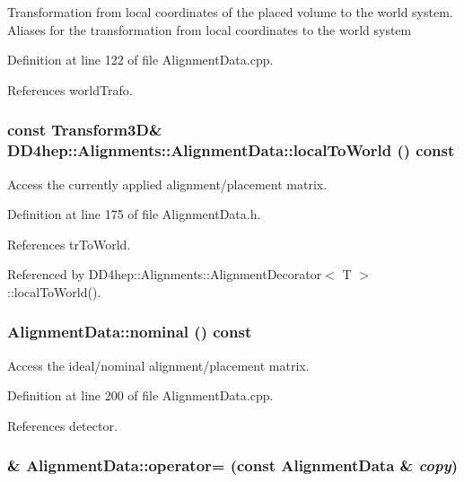 Transformation from local coordinates of the placed volume to the world system. Aliases for the transformation from local coordinates to the world system 

Definition at line 122 of file AlignmentData.cpp.

References worldTrafo.\hypertarget{class_d_d4hep_1_1_alignments_1_1_alignment_data_a080a3e23e54dfdef742d4849d9b41b5d}{
\subsubsection[{localToWorld}]{\setlength{\rightskip}{0pt plus 5cm}const Transform3D\& DD4hep::Alignments::AlignmentData::localToWorld () const}}
\label{class_d_d4hep_1_1_alignments_1_1_alignment_data_a080a3e23e54dfdef742d4849d9b41b5d}


Access the currently applied alignment/placement matrix. 

Definition at line 175 of file AlignmentData.h.

References trToWorld.

Referenced by DD4hep::Alignments::AlignmentDecorator$<$ T $>$::localToWorld().\hypertarget{class_d_d4hep_1_1_alignments_1_1_alignment_data_a88f64b05b945fa57e6fc1ea030d4e2a1}{
\subsubsection[{nominal}]{ AlignmentData::nominal () const}}
\label{class_d_d4hep_1_1_alignments_1_1_alignment_data_a88f64b05b945fa57e6fc1ea030d4e2a1}


Access the ideal/nominal alignment/placement matrix. 

Definition at line 200 of file AlignmentData.cpp.

References detector.\hypertarget{class_d_d4hep_1_1_alignments_1_1_alignment_data_a52c323f2dd5393ea5d9e77f8df11c6d0}{
\subsubsection[{operator=}]{ \& AlignmentData::operator= (const {\bf AlignmentData} \& {\em copy})}}
\label{class_d_d4hep_1_1_alignments_1_1_alignment_data_a52c323f2dd5393ea5d9e77f8df11c6d0}


